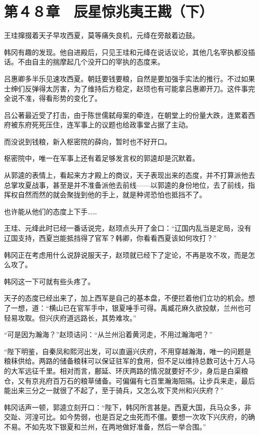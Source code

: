 \section{第４８章　辰星惊兆夷王戡（下）}

王珪撺掇着天子早攻西夏，莫等痛失良机，元绛在旁敲着边鼓。

韩冈有趣的发现。他自进殿后，只见王珪和元绛在说话议论，其他几名宰执都没插话。不由自主的揣摩起几个没开口的宰执的态度来。

吕惠卿多半乐见速攻西夏。朝廷要钱要粮，自然是要加强手实法的推行。不过如果士绅们反弹得太厉害，为了维持后方稳定，赵顼也有可能拿吕惠卿开刀。这件事完全说不准，得看形势的变化了。

吕公著最近受了打击，由于陈世儒弑母案的牵连，在朝堂上的份量大跌，连累着西府被东府死死压住，连军事上的议题也给政事堂占据了主动。

而没说到钱粮，新入枢密院的薛向，暂时也不好开口。

枢密院中，唯一在军事上还有着足够发言权的郭逵却是沉默着。

从郭逵的表情上，看起来方才殿上的商议，天子表现出来的态度，并不打算派他去总掌攻夏战事，甚至是并不准备派他去前线——以郭逵的身份地位，去了前线，指挥权自然而然的就会聚拢到他的手上，就是种谔恐怕也抵挡不了。

也许能从他们的态度上下手……

王珪、元绛此时已经一番话说完，赵顼点头开了金口：“辽国内乱当是定局，没有辽国支持，西夏岂能抵挡得了官军？韩卿，你看看西夏该如何攻打？”

韩冈正在考虑用什么说辞说服天子，赵顼就已经下了定论，不再是攻不攻，而是怎么攻了。

韩冈这一下可就有些头疼了。

天子的态度已经出来了，加上西军是自己的基本盘，不便拦着他们立功的机会。想了一想，道：“横山已在官军手中，银夏唾手可得。禹臧花麻久欲投献，兰州也可轻易攻取。但兴庆府道远路长，其势难攻。”

“可是因为瀚海？”赵顼诘问：“从兰州沿着黄河走，不用过瀚海吧？”

“陛下明鉴，自秦凤和熙河出发，可以直逼兴庆府，不用穿越瀚海，唯一的问题是粮秣供给。两路的储备粮秣可以保证驻军的食用，但不足以维持总数可达十万人马的大军远征千里。相对而言，鄜延、环庆两路的情况就要好不少，身后是白渠粮仓，又有京兆府百万石的粮草储备。可偏偏有七百里瀚海阻隔。让步兵来走，最后能出来三分之一就很了不起了，至于骑兵，又怎么攻下灵州和兴庆府？”

韩冈话声一顿，郭逵立刻开口：“陛下，韩冈所言甚是。西夏大国，兵马众多，非交趾、河湟可比。如今势弱，也是百足之虫死而不僵。要想一次攻下兴庆府，的确不易。不如先攻下银夏和兰州，在两地做好准备，然后一举合围。”

